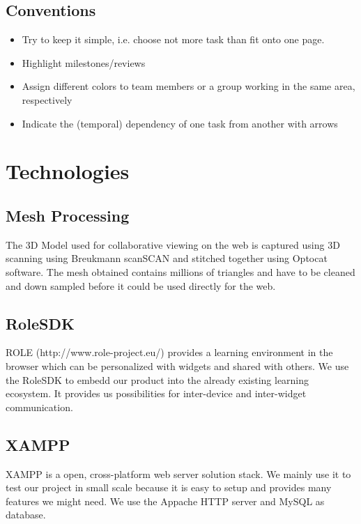 \documentclass[twoside,12pt,a4paper]{article}
\begin{document}


\subsection{Conventions} %
\label{sub:conventions}

\begin{itemize}
	\item Try to keep it simple, i.e. choose not more task than fit onto one page.
	\item Highlight milestones/reviews
	\item Assign different colors to team members or a group working in the same area, respectively
	\item Indicate the (temporal) dependency of one task from another with arrows
\end{itemize}




\newpage

\section{Technologies}
\subsection{Mesh Processing} %
\label{sec:Mesh processing}

The 3D Model used for collaborative viewing on the web is captured using 3D scanning using Breukmann scanSCAN and stitched together using Optocat software. The mesh obtained contains millions of triangles and have to be cleaned and down sampled before it could be used directly for the web.

\subsection{RoleSDK}
\label{sub:RoleSDK}
ROLE (http://www.role-project.eu/) provides a learning environment in the browser which can be personalized with widgets and shared with others. We use the RoleSDK to embedd our product into the already existing learning ecosystem. It provides us possibilities for inter-device and inter-widget communication.

\subsection{XAMPP}
\label{sub:XAMPP}
XAMPP is a open, cross-platform web server solution stack. We mainly use it to test our project in small scale because it is easy to setup and provides many features we might need. We use the Appache HTTP server and MySQL as database.
\end{document}
